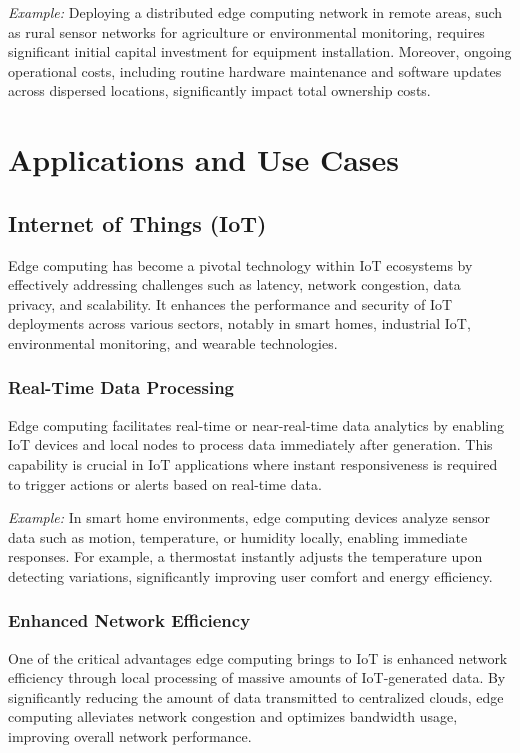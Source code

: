 \documentclass[runningheads]{llncs}
\begin{document}
\textit{Example:} Deploying a distributed edge computing network in remote areas, such as rural sensor networks for agriculture or environmental monitoring, requires significant initial capital investment for equipment installation. Moreover, ongoing operational costs, including routine hardware maintenance and software updates across dispersed locations, significantly impact total ownership costs.

\section{Applications and Use Cases}

\subsection{Internet of Things (IoT)}

Edge computing has become a pivotal technology within IoT ecosystems by effectively addressing challenges such as latency, network congestion, data privacy, and scalability. It enhances the performance and security of IoT deployments across various sectors, notably in smart homes, industrial IoT, environmental monitoring, and wearable technologies.

\subsubsection{Real-Time Data Processing}
Edge computing facilitates real-time or near-real-time data analytics by enabling IoT devices and local nodes to process data immediately after generation. This capability is crucial in IoT applications where instant responsiveness is required to trigger actions or alerts based on real-time data.

\textit{Example:} In smart home environments, edge computing devices analyze sensor data such as motion, temperature, or humidity locally, enabling immediate responses. For example, a thermostat instantly adjusts the temperature upon detecting variations, significantly improving user comfort and energy efficiency.

\subsubsection{Enhanced Network Efficiency}
One of the critical advantages edge computing brings to IoT is enhanced network efficiency through local processing of massive amounts of IoT-generated data. By significantly reducing the amount of data transmitted to centralized clouds, edge computing alleviates network congestion and optimizes bandwidth usage, improving overall network performance.
\end{document}
